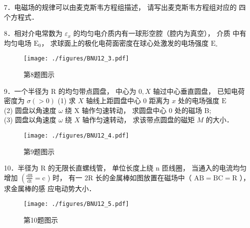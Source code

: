 7．电磁场的规律可以由麦克斯韦方程组描述， 请写出麦克斯韦方程组对应的 四个方程式．

8．相对介电常数为 $\varepsilon_{x}$ 的均匀电介质内有一球形空腔（腔内为真空）， 介质 中有均匀电场 $\mathrm{E}_{0}$， 求球面上的极化电荷面密度在球心处激发的电场强度 $\mathrm{E}_{\circ}$
\begin{figure}[ht]
\centering
\texttt{[image: ./figures/BNU12\_3.pdf]}
\caption{第8题图示} \label{BNU12_fig3}
\end{figure}

9．一个半径为 $\mathrm{R}$ 的均匀带点圆盘， 中心为 $0, X$ 轴过中心垂直圆盘， 已知电荷 密度为 $\sigma(>0)$
(1) 求 $X$ 轴线上距圆盘中心 0 距离为 $x$ 处的电场强度 $\mathrm{E} $\\
(2) 圆盘以角速度 $\omega$ 绕 $\mathrm{X}$ 轴作匀速转动， 求圆盘中心 0 处的磁场 B;\\
(3) 圆盘以角速度 $\omega$ 绕 $X$ 轴作匀速转动， 求该带点圆盘的磁矩 $M$ 的大小．
\begin{figure}[ht]
\centering
\texttt{[image: ./figures/BNU12\_4.pdf]}
\caption{第9题图示} \label{BNU12_fig4}
\end{figure}

10．半径为 $\mathrm{R}$ 的无限长直螺线管， 单位长度上绕 $\mathrm{n}$ 匝线圈， 当通入的电流均匀
增加 $\left(\frac{\mathrm{dB}}{\mathrm{dt}}=\mathrm{c}\right.$ ) 时， 有一 $2 \mathrm{R}$ 长的金属棒如图放置在磁场中（ $\mathrm{AB}=\mathrm{BC}=\mathrm{R}$ ）， 求金属棒的感
应电动势大小．
\begin{figure}[ht]
\centering
\texttt{[image: ./figures/BNU12\_5.pdf]}
\caption{第10题图示} \label{BNU12_fig5}
\end{figure}